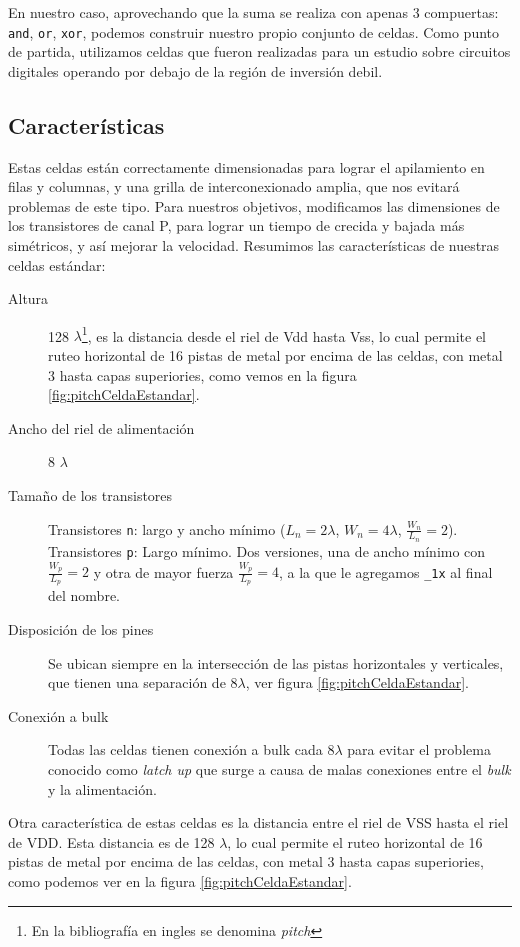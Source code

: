 En nuestro caso, aprovechando que la suma se realiza con apenas 3 compuertas: \verb.and., \verb.or., \verb.xor., podemos construir nuestro propio conjunto de celdas. Como punto de partida, utilizamos celdas que fueron realizadas para un estudio sobre circuitos digitales operando por debajo de la región de inversión debil\cite{subthresholdArith}.
\subsection{Características}
Estas celdas están correctamente dimensionadas para lograr el apilamiento en filas y columnas, y una grilla de interconexionado amplia, que nos evitará problemas de este tipo. Para nuestros objetivos, modificamos las dimensiones de los transistores de canal P, para lograr un tiempo de crecida y bajada más simétricos, y así mejorar la velocidad. Resumimos las características de nuestras celdas estándar:


\begin{description}
\item[Altura] 128 $\lambda$\footnote{En la bibliografía en ingles se denomina \emph{pitch}}, es la distancia desde el riel de Vdd hasta Vss, lo cual permite el ruteo horizontal de 16 pistas de metal por encima de las celdas, con metal 3 hasta capas superiories, como vemos en la figura \ref{fig:pitchCeldaEstandar}.  
\item[Ancho del riel de alimentación] 8 $\lambda$
\item[Tamaño de los transistores] Transistores \verb.n.: largo y ancho mínimo ($L_n = 2 \lambda$, $W_n =4 \lambda$, $\frac{W_n}{L_n}=2$). Transistores \verb.p.: Largo mínimo. Dos versiones, una de ancho mínimo con $\frac{W_p}{L_p}=2$ y otra de mayor fuerza $\frac{W_p}{L_p}=4$, a la que le agregamos \verb._1x. al final del nombre. 
\item[Disposición de los pines] Se ubican siempre en la intersección de las pistas horizontales y verticales, que tienen una separación de $8 \lambda$, ver figura \ref{fig:pitchCeldaEstandar}.
\item[Conexión a bulk] Todas las celdas tienen conexión a bulk cada $8\lambda$ para evitar el problema conocido como \emph{latch up} que surge a causa de malas conexiones entre el \emph{bulk} y la alimentación.
\end{description}


Otra característica de estas celdas es la distancia entre el riel de VSS hasta el riel de VDD. Esta distancia es de 128 $\lambda$, lo cual permite el ruteo horizontal de 16 pistas de metal por encima de las celdas, con metal 3 hasta capas superiories, como podemos ver en la figura \ref{fig:pitchCeldaEstandar}.  

